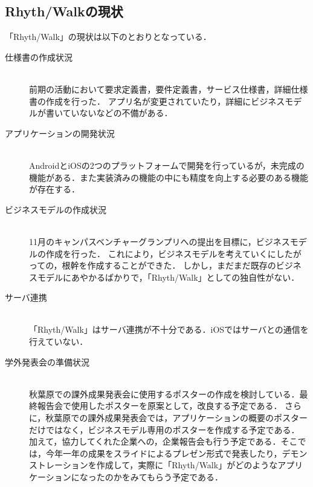 \subsection{Rhyth/Walkの現状}
「Rhyth/Walk」の現状は以下のとおりとなっている．

\begin{description}

\item[仕様書の作成状況]\mbox{}\\ 
前期の活動において要求定義書，要件定義書，サービス仕様書，詳細仕様書の作成を行った．
アプリ名が変更されていたり，詳細にビジネスモデルが書いていないなどの不備がある．

\item[アプリケーションの開発状況]\mbox{}\\  
AndroidとiOSの2つのプラットフォームで開発を行っているが，未完成の機能がある．また実装済みの機能の中にも精度を向上する必要のある機能が存在する．

\item[ビジネスモデルの作成状況]\mbox{}\\ 
11月のキャンパスベンチャーグランプリへの提出を目標に，ビジネスモデルの作成を行った．
これにより，ビジネスモデルを考えていくにしたがっての，根幹を作成することができた．
しかし，まだまだ既存のビジネスモデルにあやかるばかりで，「Rhyth/Walk」としての独自性がない．

\item[サーバ連携]\mbox{}\\
「Rhyth/Walk」はサーバ連携が不十分である．iOSではサーバとの通信を行えていない．

\item[学外発表会の準備状況]\mbox{}\\ 
秋葉原での課外成果発表会に使用するポスターの作成を検討している．最終報告会で使用したポスターを原案として，改良する予定である．
さらに，秋葉原での課外成果発表会では，アプリケーションの概要のポスターだけではなく，ビジネスモデル専用のポスターを作成する予定である．
\per
加えて，協力してくれた企業への，企業報告会も行う予定である．そこでは，今年一年の成果をスライドによるプレゼン形式で発表したり，デモンストレーションを作成して，実際に「Rhyth/Walk」がどのようなアプリケーションになったのかをみてもらう予定である．

\end{description}

